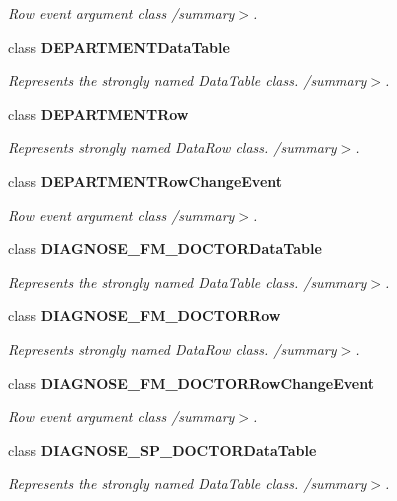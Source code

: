 \begin{CompactItemize}
\begin{CompactList}\small\item\em Row event argument class /summary$>$. \item\end{CompactList}\item 
class {\bf DEPARTMENTDataTable}
\begin{CompactList}\small\item\em Represents the strongly named DataTable class. /summary$>$. \item\end{CompactList}\item 
class {\bf DEPARTMENTRow}
\begin{CompactList}\small\item\em Represents strongly named DataRow class. /summary$>$. \item\end{CompactList}\item 
class {\bf DEPARTMENTRowChangeEvent}
\begin{CompactList}\small\item\em Row event argument class /summary$>$. \item\end{CompactList}\item 
class {\bf DIAGNOSE\_\-FM\_\-DOCTORDataTable}
\begin{CompactList}\small\item\em Represents the strongly named DataTable class. /summary$>$. \item\end{CompactList}\item 
class {\bf DIAGNOSE\_\-FM\_\-DOCTORRow}
\begin{CompactList}\small\item\em Represents strongly named DataRow class. /summary$>$. \item\end{CompactList}\item 
class {\bf DIAGNOSE\_\-FM\_\-DOCTORRowChangeEvent}
\begin{CompactList}\small\item\em Row event argument class /summary$>$. \item\end{CompactList}\item 
class {\bf DIAGNOSE\_\-SP\_\-DOCTORDataTable}
\begin{CompactList}\small\item\em Represents the strongly named DataTable class. /summary$>$. \item\end{CompactList}\item 

\end{CompactItemize}
